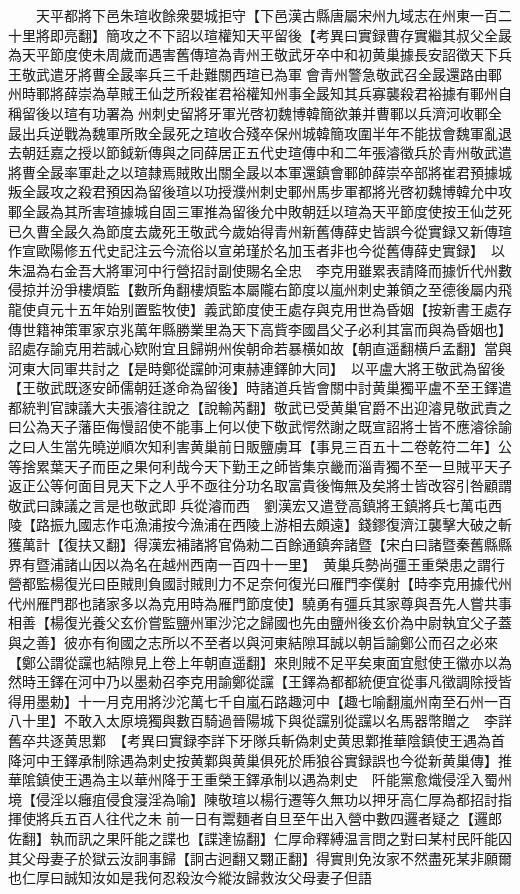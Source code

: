 　　天平都將下邑朱瑄收餘衆嬰城拒守【下邑漢古縣唐屬宋州九域志在州東一百二十里將即亮翻】簡攻之不下詔以瑄權知天平留後【考異曰實録曹存實繼其叔父全晸為天平節度使未周歲而遇害舊傳瑄為青州王敬武牙卒中和初黄巢據長安詔徵天下兵王敬武遣牙將曹全晸率兵三千赴難關西瑄已為軍會青州警急敬武召全晸還路由鄆州時鄆將薛崇為草賊王仙芝所殺崔君裕權知州事全晸知其兵寡襲殺君裕據有鄆州自稱留後以瑄有功署為州刺史留將牙軍光啓初魏博韓簡欲兼并曹鄆以兵濟河收鄆全晸出兵逆戰為魏軍所敗全晸死之瑄收合殘卒保州城韓簡攻圍半年不能拔會魏軍亂退去朝廷嘉之授以節鉞新傳與之同薛居正五代史瑄傳中和二年張濬徵兵於青州敬武遣將曹全晸率軍赴之以瑄隸焉賊敗出關全晸以本軍還鎮會鄆帥薛崇卒部將崔君預據城叛全晸攻之殺君預因為留後瑄以功授濮州刺史鄆州馬步軍都將光啓初魏博韓允中攻鄆全晸為其所害瑄據城自固三軍推為留後允中敗朝廷以瑄為天平節度使按王仙芝死已久曹全晸久為節度去歲死王敬武今歲始得青州新舊傳薛史皆誤今從實録又新傳瑄作宣歐陽修五代史記注云今流俗以宣弟瑾於名加玉者非也今從舊傳薛史實録】　以朱温為右金吾大將軍河中行營招討副使賜名全忠　李克用雖累表請降而據忻代州數侵掠并汾爭樓煩監【數所角翻樓煩監本屬隴右節度以嵐州刺史兼領之至德後屬内飛龍使貞元十五年始别置監牧使】義武節度使王處存與克用世為昏姻【按新書王處存傳世籍神策軍家京兆萬年縣勝業里為天下高貲李國昌父子必利其富而與為昏姻也】詔處存諭克用若誠心欵附宜且歸朔州俟朝命若暴横如故【朝直遥翻横戶孟翻】當與河東大同軍共討之【是時鄭從讜帥河東赫連鐸帥大同】　以平盧大將王敬武為留後【王敬武既逐安師儒朝廷遂命為留後】時諸道兵皆會關中討黄巢獨平盧不至王鐸遣都統判官諫議大夫張濬往說之【說輸芮翻】敬武已受黄巢官爵不出迎濬見敬武責之曰公為天子藩臣侮慢詔使不能事上何以使下敬武愕然謝之既宣詔將士皆不應濬徐諭之曰人生當先曉逆順次知利害黄巢前日販鹽虜耳【事見三百五十二卷乾符二年】公等捨累葉天子而臣之果何利哉今天下勤王之師皆集京畿而淄青獨不至一旦賊平天子返正公等何面目見天下之人乎不亟往分功名取富貴後悔無及矣將士皆改容引咎顧謂敬武曰諫議之言是也敬武即兵從濬而西　劉漢宏又遣登高鎮將王鎮將兵七萬屯西陵【路振九國志作屯漁浦按今漁浦在西陵上游相去頗遠】錢鏐復濟江襲擊大破之斬獲萬計【復扶又翻】得漢宏補諸將官偽勑二百餘通鎮奔諸暨【宋白曰諸暨秦舊縣縣界有暨浦諸山因以為名在越州西南一百四十一里】　黄巢兵勢尚彊王重榮患之謂行營都監楊復光曰臣賊則負國討賊則力不足奈何復光曰雁門李僕射【時李克用據代州代州雁門郡也諸家多以為克用時為雁門節度使】驍勇有彊兵其家尊與吾先人嘗共事相善【楊復光養父玄价嘗監鹽州軍沙沱之歸國也先由鹽州後玄价為中尉執宜父子蓋與之善】彼亦有徇國之志所以不至者以與河東結隙耳誠以朝旨諭鄭公而召之必來【鄭公謂從讜也結隙見上卷上年朝直遥翻】來則賊不足平矣東面宜慰使王徽亦以為然時王鐸在河中乃以墨勑召李克用諭鄭從讜【王鐸為都都統便宜從事凡徵調除授皆得用墨勅】十一月克用將沙沱萬七千自嵐石路趣河中【趣七喻翻嵐州南至石州一百八十里】不敢入太原境獨與數百騎過晉陽城下與從讜别從讜以名馬器幣贈之　李詳舊卒共逐黄思鄴　【考異曰實録李詳下牙隊兵斬偽刺史黄思鄴推華陰鎮使王遇為首降河中王鐸承制除遇為刺史按黄鄴與黄巢俱死於乕狼谷實録誤也今從新黄巢傳】推華隂鎮使王遇為主以華州降于王重榮王鐸承制以遇為刺史　阡能黨愈熾侵淫入蜀州境【侵淫以癰疽侵食寖淫為喻】陳敬瑄以楊行遷等久無功以押牙高仁厚為都招討指揮使將兵五百人往代之未前一日有鬻麵者自旦至午出入營中數四邏者疑之【邏郎佐翻】執而訊之果阡能之諜也【諜達協翻】仁厚命釋縛温言問之對曰某村民阡能囚其父母妻子於獄云汝詗事歸【詗古迥翻又翾正翻】得實則免汝家不然盡死某非願爾也仁厚曰誠知汝如是我何忍殺汝今縱汝歸救汝父母妻子但語